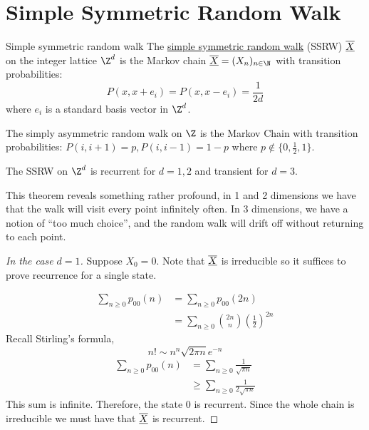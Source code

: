 \documentclass[../Main.tex]{subfiles}
\begin{document}
\section{Simple Symmetric Random Walk}
\begin{definition}{Simple symmetric random walk}
    The \underline{simple symmetric random walk} (SSRW) $\underline{\overline{X}}$ on the integer lattice $\Z^d$ is the Markov chain $\chain{X} = (X_n)_{n \in \N}$ with transition probabilities:
    \begin{equation*}
        P(x, x + e_i) = P(x, x - e_i) = \frac{1}{2d}
    \end{equation*}
    where $e_i$ is a standard basis vector in $\Z^d$.
\end{definition}
\begin{remark}
    The simply asymmetric random walk on $\Z$ is the Markov Chain with transition probabilities: $P(i, i+1) = p, P(i, i-1) = 1-p$ where $p \notin\{0, \frac12, 1\}$.
\end{remark}
\begin{theorem}
    The SSRW on $\Z^d$ is recurrent for $d = 1, 2$ and transient for $d = 3$.
    \label{thmSSRWRecurr}
\end{theorem}
\begin{remark}
    This theorem reveals something rather profound, in 1 and 2 dimensions we have that the walk will visit every point infinitely often. In 3 dimensions, we have a notion of ``too much choice'', and the random walk will drift off without returning to each point.
\end{remark}
\begin{proof}[In the case $d = 1$]
    Suppose $X_0 = 0$. Note that $\underline{\overline{X}}$ is irreducible so it suffices to prove recurrence for a single state.

    \begin{align*}
        \sum_{n \geq 0} p_{00}(n) &= \sum_{n \geq 0} p_{00}(2n) \\
        &= \sum_{n \geq 0} \binom{2n}{n} \left(\frac{1}{2}\right)^{2n}
    \end{align*}
    Recall Stirling's formula,
    \begin{equation*}
        n! \sim n^n \sqrt{2\pi n} e^{-n}  
    \end{equation*}
    \begin{align*}
        \sum_{n \geq 0} p_{00}(n) &= \sum_{n \geq 0} \frac{1}{\sqrt{\pi n}} \\
        &\geq \sum_{n \geq 0} \frac{1}{2\sqrt{\pi n}}
    \end{align*}
    This sum is infinite. Therefore, the state $0$ is recurrent. Since the whole chain is irreducible we must have that $\underline{\overline{X}}$ is recurrent.
\end{proof}
\end{document}
